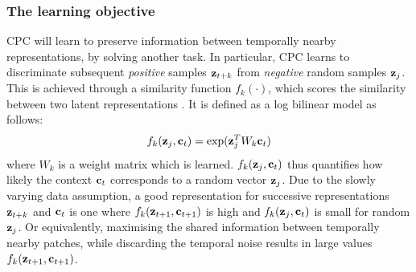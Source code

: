 \subsubsection{The learning objective}
	
	
	CPC will learn to preserve information between temporally nearby representations, by solving another task. In particular, CPC learns to discriminate subsequent \textit{positive} samples $\mathbf{z}_{t+k}$ from \textit{negative} random samples $\mathbf{z}_j$. This is achieved through a similarity function $f_k(\cdot)$, which scores the similarity between two latent representations \cite{lowePuttingEndEndtoEnd2020}. It is defined as a log bilinear model as follows:
	\begin{equation} %
		\fkdefinition \label{eq:fk}
	\end{equation}
	where $W_k$ is a weight matrix which is learned. $f_k( \mathbf{z}_j , \mathbf{c}_t )$ thus quantifies how likely the context $\mathbf{c}_t$ corresponds to a random vector $\mathbf{z}_j$. Due to the slowly varying data assumption, a good representation for successive representations $\mathbf{z}_{t+k}$ and $\mathbf{c}_t$ is one where $f_k( \mathbf{z}_{t+1}, \mathbf{c}_{t+1})$ is high and $f_k( \mathbf{z}_j, \mathbf{c}_t)$ is small for random $\mathbf{z}_j$. Or equivalently, maximising the shared information between temporally nearby patches, while discarding the temporal noise results in large values $f_k( \mathbf{z}_{t+1}, \mathbf{c}_{t+1})$.
	

